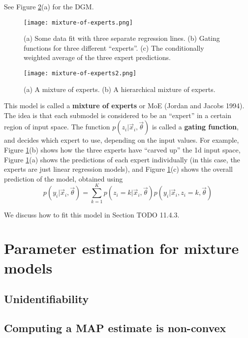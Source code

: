 See Figure \ref{fig:mixture-of-experts2}(a) for the DGM.

\begin{figure}[hbtp]
\centering
    \texttt{[image: mixture-of-experts.png]}
\caption{(a) Some data fit with three separate regression lines. (b) Gating functions for three different “experts”. (c) The conditionally weighted average of the three expert predictions.}
\label{fig:mixture-of-experts} 
\end{figure}

\begin{figure}[hbtp]
\centering
    \texttt{[image: mixture-of-experts2.png]}
\caption{(a) A mixture of experts. (b) A hierarchical mixture of experts.}
\label{fig:mixture-of-experts2} 
\end{figure}

This model is called a \textbf{mixture of experts} or MoE (Jordan and Jacobs 1994). The idea is that each submodel is considered to be an “expert” in a certain region of input space. The function $p(z_i | \vec{x}_i,\vec{\theta})$ is called a \textbf{gating function}, and decides which expert to use, depending on the input values. For example, Figure \ref{fig:mixture-of-experts}(b) shows how the three experts have “carved up” the 1d input space, Figure \ref{fig:mixture-of-experts}(a) shows the predictions of each expert individually (in this case, the experts are just linear regression models), and Figure \ref{fig:mixture-of-experts}(c) shows the overall prediction of the model, obtained using
\begin{equation}
p(y_i|\vec{x}_i,\vec{\theta})=\sum\limits_{k=1}^K p(z_i=k | \vec{x}_i,\vec{\theta})p(y_i|\vec{x}_i,z_i=k,\vec{\theta})
\end{equation}

We discuss how to fit this model in Section TODO 11.4.3.


\section{Parameter estimation for mixture models}


\subsection{Unidentifiability}


\subsection{Computing a MAP estimate is non-convex}


